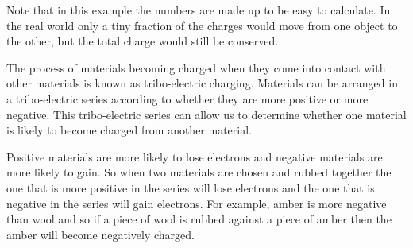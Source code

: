 \begin{minipage}{.4\textwidth}

      \label{m38780*id200825}Note that in this example the numbers are made up to be easy to calculate. In the real world only a tiny fraction of the charges would move from one object to the other, but the total charge would still be conserved.\par {}
The process of materials becoming charged when they come into contact with other materials is known as tribo-electric charging. Materials can be arranged in a tribo-electric series according to whether they are more positive or more negative. This tribo-electric series can allow us to determine whether one material is likely to become charged from another material. 

Positive materials are more likely to lose electrons and negative materials are more likely to gain. So when two materials are chosen and rubbed together the one that is more positive in the series will lose electrons and the one that is negative in the series will gain electrons.
 For example, amber is more negative than wool and so if a piece of wool is rubbed against a piece of amber then the amber will become negatively charged.\end{minipage}
